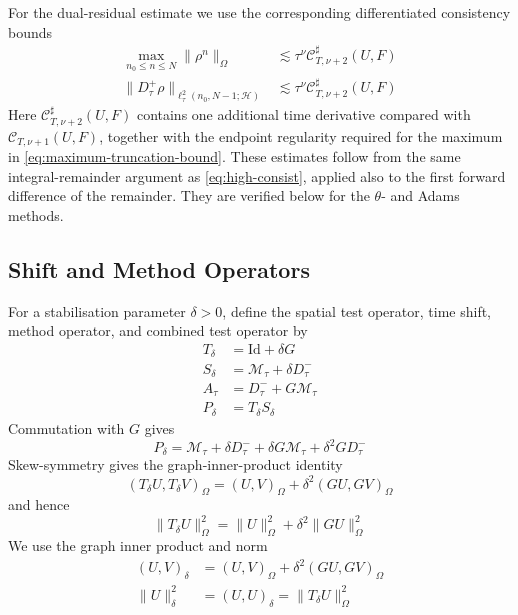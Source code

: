 \documentclass[11pt]{article}
\begin{document}
For the dual-residual estimate we use the corresponding differentiated
consistency bounds
\begin{align}
\max_{n_0\le n\le N}\|\rho^n\|_{\Omega}
&\lesssim\tau^\nu\mathcal C^{\sharp}_{T,\nu+2}(U,F)
\label{eq:maximum-truncation-bound}\\
\|D_{\tau}^{+}\rho\|_{\ell_{\tau}^2(n_0,N-1;\mathcal H)}
&\lesssim\tau^\nu\mathcal C^{\sharp}_{T,\nu+2}(U,F)
\label{eq:differentiated-truncation-bound}
\end{align}
Here \(\mathcal C^{\sharp}_{T,\nu+2}(U,F)\) contains one additional time
derivative compared with \(\mathcal C_{T,\nu+1}(U,F)\), together with the
endpoint regularity required for the maximum in
\eqref{eq:maximum-truncation-bound}. These estimates follow from the same
integral-remainder argument as \eqref{eq:high-consist}, applied also to the
first forward difference of the remainder. They are verified below for the
\(\theta\)- and Adams methods.


\subsection{Shift and Method Operators}
\label{subsec:shift-method-operators}
For a stabilisation parameter \(\delta>0\), define the spatial test operator,
time shift, method operator, and combined test operator by
\begin{align}
T_{\delta}&=\mathrm{Id}+\delta G \label{eq:spatial-test-operator}\\
S_{\delta}&=\mathcal M_{\tau}+\delta D_{\tau}^{-} \label{eq:time-shift-operator}\\
A_{\tau}&=D_{\tau}^{-}+G\mathcal M_{\tau} \label{eq:method-operator}\\
P_{\delta}&=T_{\delta}S_{\delta} \label{eq:combined-test-operator}
\end{align}
Commutation with \(G\) gives
\begin{equation}
P_{\delta}=\mathcal M_{\tau}+\delta D_{\tau}^{-}
+\delta G\mathcal M_{\tau}+\delta^2GD_{\tau}^{-} \label{eq:combined-test-expansion}
\end{equation}
Skew-symmetry gives the graph-inner-product identity
\begin{equation}
(T_{\delta}U,T_{\delta}V)_{\Omega}
=(U,V)_{\Omega}+\delta^2(GU,GV)_{\Omega} \label{eq:test-operator-inner-product}
\end{equation}
and hence
\begin{equation}
\|T_{\delta}U\|_{\Omega}^2
=\|U\|_{\Omega}^2+\delta^2\|GU\|_{\Omega}^2 \label{eq:test-operator-norm}
\end{equation}
We use the graph inner product and norm
\begin{align}
(U,V)_{\delta}
&=(U,V)_{\Omega}+\delta^2(GU,GV)_{\Omega} \label{eq:graph-inner-product}\\
\|U\|_{\delta}^2
&=(U,U)_{\delta}=\|T_{\delta}U\|_{\Omega}^2 \label{eq:graph-norm}
\end{align}
\end{document}
